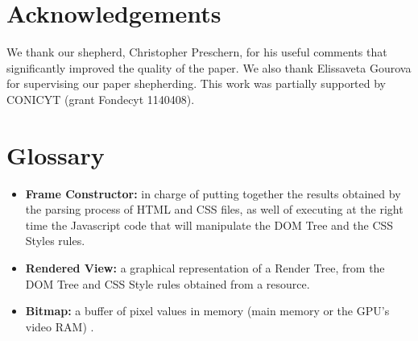 \documentclass[]{acmlarge}
\begin{document}
\section{Acknowledgements}
We thank our shepherd, Christopher Preschern, for his useful comments that significantly improved the quality of the paper. We also thank Elissaveta Gourova for supervising our paper shepherding. 
This work was partially supported by CONICYT (grant Fondecyt 1140408).

\section{Glossary}
\begin{itemize}\leftskip0.2em
  \item \textbf{Frame Constructor:} in charge of putting together the results obtained by the parsing process of HTML and CSS files, as well of executing at the right time the Javascript code that will manipulate the DOM Tree and the CSS Styles rules. 
  \item \textbf{Rendered View:} a graphical representation of a Render Tree, from the DOM Tree and CSS Style rules obtained from a resource.
  \item \textbf{Bitmap:} a buffer of pixel values in memory (main memory or the GPU’s video RAM) \cite{gpuchrome}.
\end{itemize}







  
\end{document}
